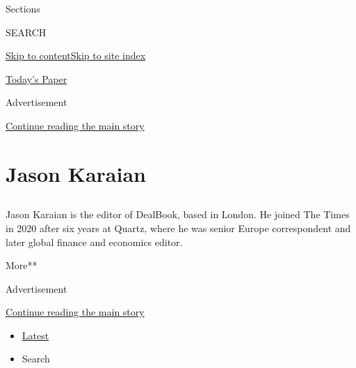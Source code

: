 Sections

SEARCH

\protect\hyperlink{site-content}{Skip to
content}\protect\hyperlink{site-index}{Skip to site index}

\href{https://myaccount.nytimes3xbfgragh.onion/auth/login?response_type=cookie\&client_id=vi}{}

\href{https://www.nytimes3xbfgragh.onion/section/todayspaper}{Today's
Paper}

Advertisement

\protect\hyperlink{after-top}{Continue reading the main story}

\hypertarget{jason-karaian}{%
\section{Jason Karaian}\label{jason-karaian}}

\subsection{}

Jason Karaian is the editor of DealBook, based in London. He joined The
Times in 2020 after six years at Quartz, where he was senior Europe
correspondent and later global finance and economics editor.

More**

Advertisement

\protect\hyperlink{after-mid1}{Continue reading the main story}

\begin{itemize}
\tightlist
\item
  \protect\hyperlink{stream-panel}{Latest}
\item
  Search
\end{itemize}

